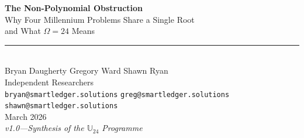 \documentclass[11pt,a4paper]{article}
\theoremstyle{plain}
\theoremstyle{definition}
\theoremstyle{remark}
\begin{document}
\thispagestyle{empty}


\vspace*{20pt}
\begin{center}

{\fontsize{22}{26}\selectfont\bfseries\color{accent}
The Non-Polynomial Obstruction\\[4pt]}
{\fontsize{16}{20}\selectfont\color{accentlight}
Why Four Millennium Problems Share a Single Root\\[2pt]
and What $\Omega = 24$ Means}\\[20pt]

{\color{titlegold}\rule{6cm}{0.8pt}}\\[20pt]

{\Large Bryan Daugherty \quad Gregory Ward \quad Shawn Ryan}\\[8pt]
{\small\color{subtlegray}
Independent Researchers\\[2pt]
\texttt{bryan@smartledger.solutions}\quad
\texttt{greg@smartledger.solutions}\quad
\texttt{shawn@smartledger.solutions}}\\[16pt]

{\normalsize\color{subtlegray} March 2026}\\[6pt]
{\small\color{subtlegray}\itshape v1.0\enspace---\enspace Synthesis of the $\mathbb{U}_{24}$ Programme}

\end{center}
\vspace{16pt}
\end{document}
